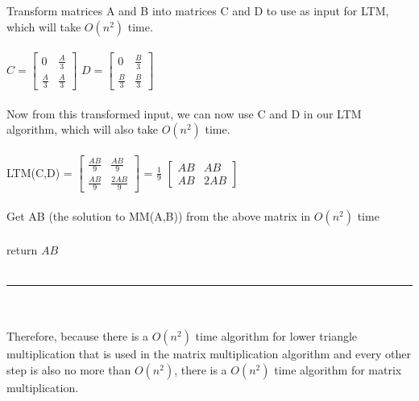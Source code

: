\documentclass[12pt]{article}
\begin{document}
Transform matrices A and B into matrices C and D to use as input for LTM, which will take {$O(n^2)$} time.\\\\
$C = \begin{bmatrix}
0 & \frac{A}{3}\\[0.3em]
\frac{A}{3} & \frac{A}{3}
\end{bmatrix}$
$D = \begin{bmatrix}
0 & \frac{B}{3}\\[0.3em]
\frac{B}{3} & \frac{B}{3}
\end{bmatrix}$\\\\
Now from this transformed input, we can now use C and D in our LTM algorithm, which will also take {$O(n^2)$} time.\\\\
LTM(C,D) = $\begin{bmatrix}
\frac{AB}{9} & \frac{AB}{9}\\[0.3em]
\frac{AB}{9} & \frac{2AB}{9}
\end{bmatrix}$
=
{$\frac{1}{9}$} $\begin{bmatrix}
AB & AB\\[0.3em]
AB & 2AB
\end{bmatrix}$ \\\\
Get AB (the solution to MM(A,B)) from the above matrix in {$O(n^2)$} time\\\\
{return $AB$}\\\\
\noindent\rule{14cm}{0.4pt}\\\\
Therefore, because there is a {$O(n^2)$} time algorithm for lower triangle multiplication that is used in the matrix multiplication algorithm and every other step is also no more than {$O(n^2)$}, there is a {$O(n^2)$} time algorithm for matrix multiplication.
\end{document}
